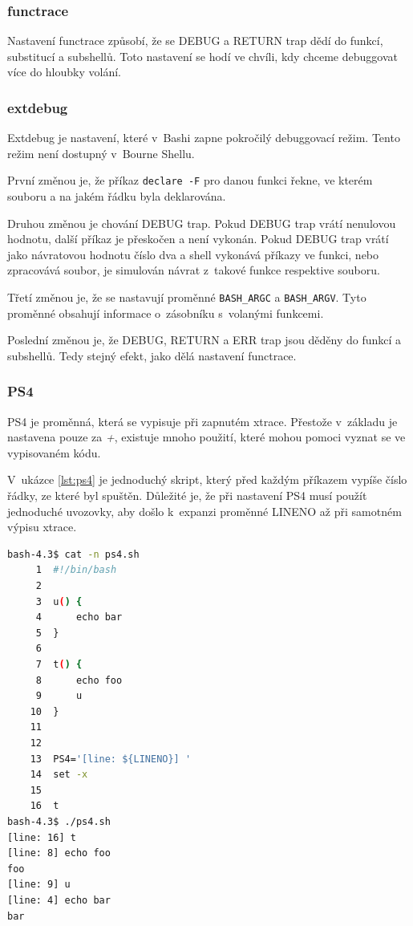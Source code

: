 \documentclass[thesis=M,czech]{FITthesis}[2012/06/26]
\begin{document}
%
%
%
\subsubsection{functrace}

Nastavení functrace způsobí, že se DEBUG a RETURN trap dědí do funkcí, substitucí a subshellů. Toto nastavení se hodí ve chvíli, kdy chceme debuggovat více do hloubky volání.

%
%
%
\subsubsection{extdebug}

Extdebug je nastavení, které v~Bashi zapne pokročilý debuggovací režim. Tento režim není dostupný v~Bourne Shellu.

První změnou je, že příkaz \texttt{declare -F} pro danou funkci řekne, ve kterém souboru a na jakém řádku byla deklarována.

Druhou změnou je chování DEBUG trap. Pokud DEBUG trap vrátí nenulovou hodnotu, další příkaz je přeskočen a není vykonán. Pokud DEBUG trap vrátí jako návratovou hodnotu číslo dva a shell vykonává příkazy ve funkci, nebo zpracovává soubor, je simulován návrat z~takové funkce respektive souboru.

Třetí změnou je, že se nastavují proměnné \texttt{BASH\_ARGC} a \texttt{BASH\_ARGV}. Tyto proměnné obsahují informace o~zásobníku s~volanými funkcemi.

Poslední změnou je, že DEBUG, RETURN a ERR trap jsou děděny do funkcí a subshellů. Tedy stejný efekt, jako dělá nastavení functrace.

%
%
%
\subsubsection{PS4}
PS4 je proměnná, která se vypisuje při zapnutém xtrace. Přestože v~základu je nastavena pouze za \textit{+}, existuje mnoho použití, které mohou pomoci vyznat se ve vypisovaném kódu.

V~ukázce \ref{lst:ps4} je jednoduchý skript, který před každým příkazem vypíše číslo řádky, ze které byl spuštěn. Důležité je, že při nastavení PS4 musí použít jednoduché uvozovky, aby došlo k~expanzi proměnné LINENO až při samotném výpisu xtrace.

\begin{minipage}{\linewidth}
\begin{lstlisting}[language=bash, caption={ps4}, label={lst:ps4}]
bash-4.3$ cat -n ps4.sh
     1	#!/bin/bash
     2
     3	u() {
     4		echo bar
     5	}
     6
     7	t() {
     8		echo foo
     9		u
    10	}
    11
    12
    13	PS4='[line: ${LINENO}] '
    14	set -x
    15
    16	t
bash-4.3$ ./ps4.sh
[line: 16] t
[line: 8] echo foo
foo
[line: 9] u
[line: 4] echo bar
bar
\end{lstlisting}
\end{minipage}
\end{document}
